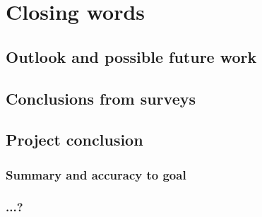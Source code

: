 
\chapter{Closing words}\label{chapter:outlook}

\section{Outlook and possible future work}
\section{Conclusions from surveys}
\section{Project conclusion}
\subsection{Summary and accuracy to goal}
\subsection{...?}